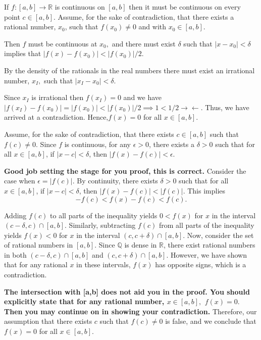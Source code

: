 \documentclass{report}
\begin{document}
\pagebreak
{}
\begin{myproof}
    

If $f:[a, b] \rightarrow \mathbb{R}$ is continuous on $[a, b]$ then it must be continuous on every point $c \in [a,b].$ Assume, for the sake of contradiction, that there exists a rational number, $x_0$, such that $f(x_0) \not =0 $ and with $x_0 \in [a,b]$.

Then $f$ must be continuous at $x_0,$ and there must exist $\delta$ such that $|x-x_0| < \delta$ implies that $|f(x) - f(x_0)| < |f(x_0)|/2.$ 

By the density of the rationals in the real numbers there must exist an irrational number, $x_I,$ such that $|x_I - x_0| < \delta.$ 

Since $x_I$ is irrational then $f(x_I) = 0$ and we have $|f(x_I) - f(x_0)| =  |f(x_0)| < \left|f(x_0)\right|/2 \implies 1 < 1/2 \rightarrow\!\leftarrow.$  Thus, we have arrived at a contradiction. Hence,$f(x)=0$ for all $x \in[a, b].$

\end{myproof}

Assume, for the sake of contradiction, that there exists $c \in[a, b]$ such that $f(c) \neq 0$. Since $f$ is continuous, for any $\epsilon>0$, there exists a $\delta>0$ such that for all $x \in[a, b]$, if $|x-c|<\delta$, then $|f(x)-f(c)|<\epsilon$.


\textbf{Good job setting the stage for you proof, this is correct.}
Consider the case when $\epsilon=|f(c)|$. By continuity, there exists $\delta>0$ such that for all $x \in[a, b]$, if $|x-c|<\delta$, then $|f(x)-f(c)|<|f(c)|$. This implies
$$
-f(c)<f(x)-f(c)<f(c) .
$$

Adding $f(c)$ to all parts of the inequality yields $0<f(x)$ for $x$ in the interval $(c-\delta, c) \cap[a, b]$. Similarly, subtracting $f(c)$ from all parts of the inequality yields $f(x)<0$ for $x$ in the interval $(c, c+\delta) \cap[a, b]$. Now, consider the set of rational numbers in $[a, b]$. Since $\mathbb{Q}$ is dense in $\mathbb{R}$, there exist rational numbers in both $(c-\delta, c) \cap[a, b]$ and $(c, c+\delta) \cap[a, b]$. However, we have shown that for any rational $x$ in these intervals, $f(x)$ has opposite signs, which is a contradiction.

\textbf{
  The intersection with [a,b] does not aid you in the proof. You should explicitly state that for any rational number, $x \in [a,b],$ $f(x) = 0.$ Then you may continue on in showing your contradiction. 
} 
Therefore, our assumption that there exists $c$ such that $f(c) \neq 0$ is false, and we conclude that $f(x)=0$ for all $x \in[a, b]$.
\end{document}
